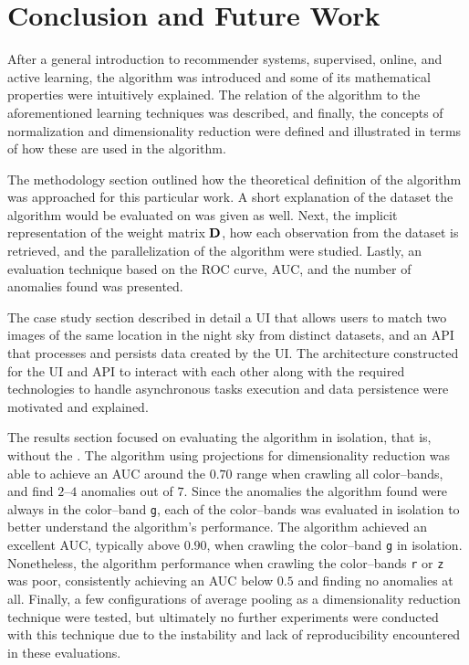 \chapter{Conclusion and Future Work} \label{ch:conclusion}

After a general introduction to recommender systems, supervised, online, and active learning, the \mlblink algorithm was introduced and some of its mathematical properties were intuitively explained. The relation of the \mlblink algorithm to the aforementioned learning techniques was described, and finally, the concepts of normalization and dimensionality reduction were defined and illustrated in terms of how these are used in the \mlblink algorithm. \newline

The methodology section outlined how the theoretical definition of the \mlblink algorithm was approached for this particular work. A short explanation of the dataset the \mlblink algorithm would be evaluated on was given as well. Next, the implicit representation of the weight matrix $\boldsymbol{\mathbf{D}}$, how each observation from the dataset is retrieved, and the parallelization of the \mlblink algorithm were studied. Lastly, an evaluation technique based on the ROC curve, AUC, and the number of anomalies found was presented. \newline

The case study section described in detail a UI that allows users to match two images of the same location in the night sky from distinct datasets, and an API that processes and persists data created by the UI. The architecture constructed for the UI and API to interact with each other along with the required technologies to handle asynchronous tasks execution and data persistence were motivated and explained. \newline

The results section focused on evaluating the \mlblink algorithm in isolation, that is, without the \mlblinkui. The \mlblink algorithm using projections for dimensionality reduction was able to achieve an AUC around the $0.70$ range when crawling all \panstarrs color--bands, and find $2$--$4$ anomalies out of $7$. Since the anomalies the \mlblink algorithm found were always in the \panstarrs color--band \texttt{g}, each of the \panstarrs color--bands was evaluated in isolation to better understand the algorithm's performance. The \mlblink algorithm achieved an excellent AUC, typically above $0.90$, when crawling the \panstarrs color--band \texttt{g} in isolation. Nonetheless, the \mlblink algorithm performance when crawling the \panstarrs color--bands \texttt{r} or \texttt{z} was poor, consistently achieving an AUC below $0.5$ and finding no anomalies at all. Finally, a few configurations of average pooling as a dimensionality reduction technique were tested, but ultimately no further experiments were conducted with this technique due to the instability and lack of reproducibility encountered in these evaluations. \newline

